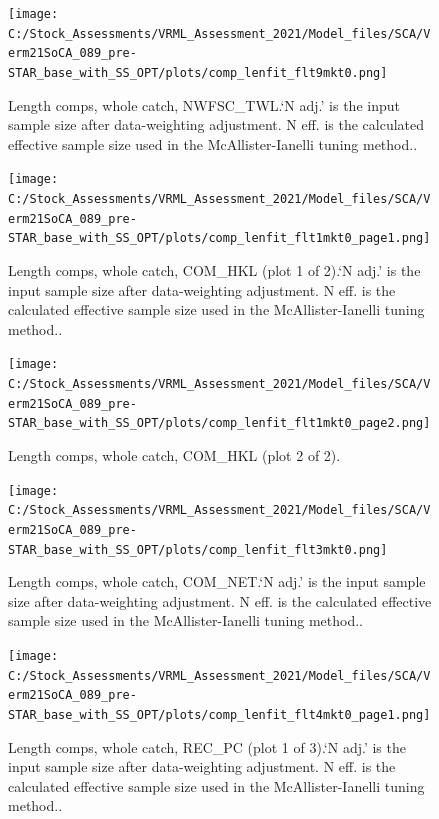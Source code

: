 \documentclass[
  english,
  a4paper,
]{article}
\begin{document}
\begin{figure}
\centering
\texttt{[image: C:/Stock\_Assessments/VRML\_Assessment\_2021/Model\_files/SCA/Verm21SoCA\_089\_pre-STAR\_base\_with\_SS\_OPT/plots/comp\_lenfit\_flt9mkt0.png]}
\caption{Length comps, whole catch, NWFSC\_TWL.`N adj.' is the input sample size after data-weighting adjustment. N eff. is the calculated effective sample size used in the McAllister-Ianelli tuning method..\label{fig:comp_lenfit_flt9mkt0}}
\end{figure}

\begin{figure}
\centering
\texttt{[image: C:/Stock\_Assessments/VRML\_Assessment\_2021/Model\_files/SCA/Verm21SoCA\_089\_pre-STAR\_base\_with\_SS\_OPT/plots/comp\_lenfit\_flt1mkt0\_page1.png]}
\caption{Length comps, whole catch, COM\_HKL (plot 1 of 2).`N adj.' is the input sample size after data-weighting adjustment. N eff. is the calculated effective sample size used in the McAllister-Ianelli tuning method..\label{fig:comp_lenfit_flt1mkt0_page1}}
\end{figure}

\begin{figure}
\centering
\texttt{[image: C:/Stock\_Assessments/VRML\_Assessment\_2021/Model\_files/SCA/Verm21SoCA\_089\_pre-STAR\_base\_with\_SS\_OPT/plots/comp\_lenfit\_flt1mkt0\_page2.png]}
\caption{Length comps, whole catch, COM\_HKL (plot 2 of 2).\label{fig:comp_lenfit_flt1mkt0_page2}}
\end{figure}

\begin{figure}
\centering
\texttt{[image: C:/Stock\_Assessments/VRML\_Assessment\_2021/Model\_files/SCA/Verm21SoCA\_089\_pre-STAR\_base\_with\_SS\_OPT/plots/comp\_lenfit\_flt3mkt0.png]}
\caption{Length comps, whole catch, COM\_NET.`N adj.' is the input sample size after data-weighting adjustment. N eff. is the calculated effective sample size used in the McAllister-Ianelli tuning method..\label{fig:comp_lenfit_flt3mkt0}}
\end{figure}

\begin{figure}
\centering
\texttt{[image: C:/Stock\_Assessments/VRML\_Assessment\_2021/Model\_files/SCA/Verm21SoCA\_089\_pre-STAR\_base\_with\_SS\_OPT/plots/comp\_lenfit\_flt4mkt0\_page1.png]}
\caption{Length comps, whole catch, REC\_PC (plot 1 of 3).`N adj.' is the input sample size after data-weighting adjustment. N eff. is the calculated effective sample size used in the McAllister-Ianelli tuning method..\label{fig:comp_lenfit_flt4mkt0_page1}}
\end{figure}
\end{document}
